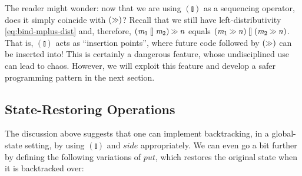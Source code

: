 \documentclass{llncs}
\newcommand{\Conid}[1]{\mathit{#1}}
\newcommand{\Varid}[1]{\mathit{#1}}
\def\resethooks{%
  \global\let\SaveRestoreHook\empty
  \global\let\ColumnHook\empty}
\let\hspre\empty
\let\hspost\empty
\let\Varid\mathit
\let\Conid\mathsf
\begin{document}
The reader might wonder: now that we are using \ensuremath{(\mathbin{\talloblong})} as a sequencing operator, does it simply coincide with \ensuremath{(\mathbin{\hstretch{0.7}{>\!\!>}})}?
Recall that we still have left-distributivity \eqref{eq:bind-mplus-dist} and, therefore,
\ensuremath{(\Varid{m}_{1}\mathbin{\talloblong}\Varid{m}_{2})\mathbin{\hstretch{0.7}{>\!\!>}}\Varid{n}} equals \ensuremath{(\Varid{m}_{1}\mathbin{\hstretch{0.7}{>\!\!>}}\Varid{n})\mathbin{\talloblong}(\Varid{m}_{2}\mathbin{\hstretch{0.7}{>\!\!>}}\Varid{n})}.
That is, \ensuremath{(\mathbin{\talloblong})} acts as ``insertion points'', where future code followed by \ensuremath{(\mathbin{\hstretch{0.7}{>\!\!>}})} can be inserted into!
This is certainly a dangerous feature, whose undisciplined use can lead to chaos.
However, we will exploit this feature and develop a safer programming pattern in the next section.

\subsection{State-Restoring Operations}
\label{subsec:state-restoring-ops}

The discussion above suggests that one can implement backtracking, in a global-state setting, by using \ensuremath{(\talloblong)} and \ensuremath{\Varid{side}} appropriately.
We can even go a bit further by defining the following variations of \ensuremath{\Varid{put}},
which restores the original state when it is backtracked over:
\resethooks
\end{document}
